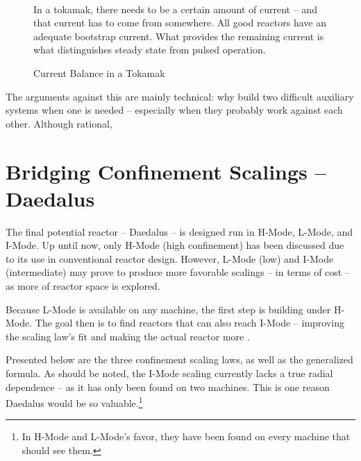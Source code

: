 \begin{figure}
	\centering
	\begin{adjustbox}{width=0.75\textwidth}
		
	\end{adjustbox}
	\caption{Current Balance in a Tokamak} ~\\
	\small In a tokamak, there needs to be a certain amount of current -- and that current has to come from somewhere. All good reactors have an adequate bootstrap current. What provides the remaining current is what distinguishes steady state from pulsed operation.
	\label{fig:cur_balance_final}
\end{figure}

The arguments against this are mainly technical: why build two difficult auxiliary systems when one is needed -- especially when they probably work against each other. Although rational, 

\section{Bridging Confinement Scalings -- Daedalus}

The final potential reactor -- Daedalus -- is designed  run in H-Mode, L-Mode, and I-Mode. Up until now, only H-Mode (high confinement) has been discussed due to its use in conventional reactor design. However, L-Mode (low) and I-Mode\cite{imode} (intermediate) may prove to produce more favorable scalings -- in terms of cost -- as more of reactor space is explored.

Because L-Mode is available on any machine, the first step is  building under H-Mode. The goal then is to find reactors that can also reach I-Mode --  improving the scaling law's fit and  making the actual reactor more .

Presented below are the three confinement scaling laws, as well as the generalized formula. As should be noted, the I-Mode scaling currently lacks a true radial dependence -- as it has only been found on two machines.\cite{imode} This is one reason Daedalus would be so valuable.\footnote{In H-Mode and L-Mode's favor, they have been found on every machine that should see them. }


